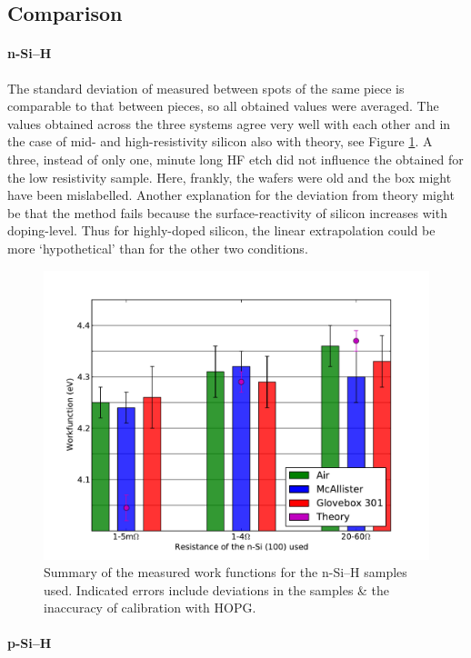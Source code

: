 \documentclass[a4paper,10pt]{article}
\newcommand{\sih}{Si--H}
\newcommand{\cpd}{\text{CPD}}
\newcommand{\hopg}{HOPG}
\begin{document}
\subsection{Comparison}
\paragraph{n-\sih{}}
The standard deviation of measured \cpd{} between spots of the same piece is comparable to that between pieces, so all obtained values were averaged. The values obtained across the three systems agree very well with each other and in the case of mid- and high-resistivity silicon also with theory, see Figure \ref{fig:nsih}. A three,  instead of only one, minute long HF etch did not influence the \cpd{} obtained for the low resistivity sample. Here, frankly, the wafers were old and the box might have been mislabelled. Another explanation for the deviation from theory might be that the method fails because the surface-reactivity of silicon increases with doping-level. Thus for highly-doped silicon, the linear extrapolation could be more \lq{}hypothetical\rq{} than for the other two conditions. 
\begin{figure}[h]
\label{fig:nsih}
	\includegraphics[width=1\textwidth]{Sih}
\caption{Summary of the measured work functions for the n-\sih{} samples used. Indicated errors include deviations in the samples \& the inaccuracy of calibration with \hopg{}.}
	\label{fig:nsih}
\end{figure}

\paragraph{p-\sih{}}
\end{document}
